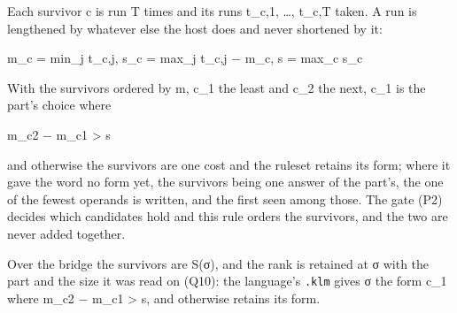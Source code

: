 Each survivor c is run T times and its runs t\_\allowbreak{}c,1, …, t\_\allowbreak{}c,T taken. A run is lengthened by whatever else the host does and never shortened by it:

m\_\allowbreak{}c = min\_\allowbreak{}j t\_\allowbreak{}c,j,  s\_\allowbreak{}c = max\_\allowbreak{}j t\_\allowbreak{}c,j − m\_\allowbreak{}c,  s = max\_\allowbreak{}c s\_\allowbreak{}c

With the survivors ordered by m, c\_\allowbreak{}1 the least and c\_\allowbreak{}2 the next, c\_\allowbreak{}1 is the part's choice where

m\_\allowbreak{}c2 − m\_\allowbreak{}c1 > s

and otherwise the survivors are one cost and the ruleset retains its form; where it gave the word no form yet, the survivors being one answer of the part's, the one of the fewest operands is written, and the first seen among those. The gate (P2) decides which candidates hold and this rule orders the survivors, and the two are never added together.

Over the bridge the survivors are S(σ), and the rank is retained at σ with the part and the size it was read on (Q10): the language's \texttt{.\allowbreak{}klm} gives σ the form c\_\allowbreak{}1 where m\_\allowbreak{}c2 − m\_\allowbreak{}c1 > s, and otherwise retains its form.

